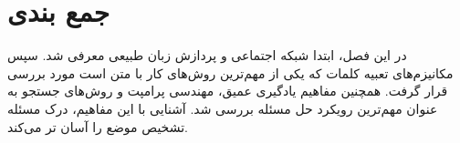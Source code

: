 \section{جمع بندی}
در این فصل، ابتدا شبکه اجتماعی و پردازش زبان طبیعی معرفی شد. سپس مکانیزم‌های تعبیه کلمات که یکی از مهم‌ترین روش‌های کار با متن است مورد بررسی قرار گرفت. همچنین مفاهیم یادگیری عمیق، مهندسی پرامپت و روش‌های جستجو به عنوان مهم‌ترین رویکرد حل مسئله بررسی شد. آشنایی با این مفاهیم، درک مسئله تشخیص موضع را آسان تر می‌کند.
	



